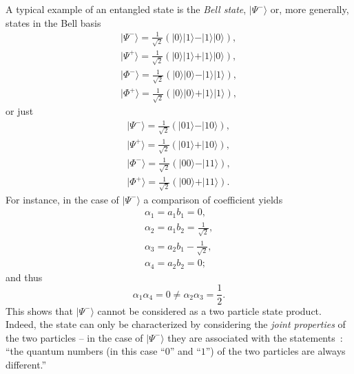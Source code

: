 {\color{blue}
\bexample
\label{bellstate1}
A typical example of an entangled state is the
{\em Bell state},   $\vert \Psi^- \rangle$
or, more generally, states in the Bell basis  
\begin{equation}
\begin{split}
\vert \Psi^- \rangle = \frac{1}{\sqrt{2}}\left(\vert 0 \rangle \vert 1 \rangle - \vert 1 \rangle \vert 0 \rangle  \right),\\
\vert \Psi^+ \rangle = \frac{1}{\sqrt{2}}\left(\vert 0 \rangle \vert 1 \rangle + \vert 1 \rangle \vert 0 \rangle  \right),\\
\vert \Phi^- \rangle = \frac{1}{\sqrt{2}}\left(\vert 0 \rangle \vert 0 \rangle - \vert 1 \rangle \vert 1 \rangle  \right),\\
\vert \Phi^+ \rangle = \frac{1}{\sqrt{2}}\left(\vert 0 \rangle \vert 0 \rangle + \vert 1 \rangle \vert 1 \rangle  \right),
\end{split}
\label{2014-m-ch-fdvs-bellbasis}
\end{equation}
or just
\begin{equation}
\begin{split}
\vert \Psi^- \rangle = \frac{1}{\sqrt{2}}\left(\vert 0   1 \rangle - \vert 1   0 \rangle  \right),\\
\vert \Psi^+ \rangle = \frac{1}{\sqrt{2}}\left(\vert 0   1 \rangle + \vert 1   0 \rangle  \right),\\
\vert \Phi^- \rangle = \frac{1}{\sqrt{2}}\left(\vert 0   0 \rangle - \vert 1   1 \rangle  \right),\\
\vert \Phi^+ \rangle = \frac{1}{\sqrt{2}}\left(\vert 0   0 \rangle + \vert 1   1 \rangle  \right).
\end{split}
\label{2014-m-ch-fdvs-bellbasis2}
\end{equation}
For instance, in the case of $\vert \Psi^- \rangle$ a comparison of coefficient yields
\begin{equation}
\begin{split}
\alpha_1=a_1b_1=0,\\
\alpha_2=a_1b_2=\frac{1}{\sqrt{2}},\\
\alpha_3=a_2b_1-\frac{1}{\sqrt{2}},\\
\alpha_4=a_2b_2=0;
\end{split}
\label{2012-m-ch-fdvs-BellSCC}
\end{equation}
and thus  $${\alpha_1}{\alpha_4}=0 \neq {\alpha_2}{\alpha_3}=\frac{1}{2}.$$
This shows that  $\vert \Psi^- \rangle$ cannot be considered as a two particle state product.
Indeed, the state can only be characterized by considering the {\em joint properties}
of the two particles --
in the case of  $\vert \Psi^- \rangle$ they are associated with the statements~\cite{zeil-99}:
``the quantum numbers (in this case ``$0$'' and ``$1$'') of the two particles are always different.''

\eexample
}



